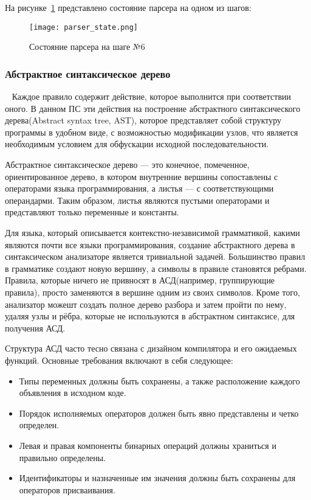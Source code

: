 На рисунке~\ref{fig:arch_and_mod::lr_example_img} представлено состояние парсера на одном из шагов:

\begin{figure}[!htb]
  \centering
  \texttt{[image: parser\_state.png]}
  \caption{ Состояние парсера на шаге №6 }
  \label{fig:arch_and_mod::lr_example_img}
\end{figure}

\FloatBarrier


\subsubsection{Абстрактное синтаксическое дерево}~
\label{sub:arch_and_mod:ast}
Каждое правило содержит действие, которое выполнится при соответствии оного. В данном ПС эти действия на построение абстрактного синтаксического дерева(Abstract syntax tree, AST), которое представляет собой структуру программы в удобном виде, с возможностью модификации узлов, что является необходимым условием для обфускации исходной последовательности.

Абстрактное синтаксическое дерево --- это конечное, помеченное, ориентированное дерево, в котором внутренние вершины сопоставлены с операторами языка программирования, а листья --- с соответствующими операндарми. Таким образом, листья являются пустыми операторами и представляют только переменные и константы.

Для языка, который описывается контекстно-независимой грамматикой, какими являются почти все языки программирования, создание абстрактного дерева в синтаксическом анализаторе является тривиальной задачей. Большинство правил в грамматике создают новую вершину, а символы в правиле становятся ребрами. Правила, которые ничего не привносят в АСД(например, группирующие правила), просто заменяются в вершине одним из своих символов. Кроме того, анализатор можешт создать полное дерево разбора и затем пройти по нему, удаляя узлы и рёбра, которые не используются в абстрактном синтаксисе, для получения АСД.

Структура АСД часто тесно связана с дизайном компилятора и его ожидаемых функций.
Основные требования включают в себя следующее:
\begin{itemize}
\item  Типы переменных должны быть сохранены, а также расположение каждого объявления в исходном коде.
\item  Порядок исполняемых операторов должен быть явно представлены и четко определен.
\item  Левая и правая компоненты бинарных операций должны храниться и правильно определены.
\item  Идентификаторы и назначенные им значения должны быть сохранены для операторов присваивания.
\end{itemize}

